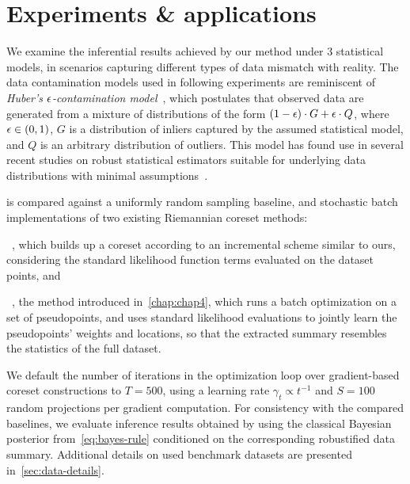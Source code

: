 \section{Experiments \& applications}
\label{sec:evaluation}
\newcommand{\MYhref}[3][oxfordblue]{\href{#2}{\color{#1}{#3}}}%

We examine the inferential results achieved by our method under 3 statistical models, in scenarios capturing different types of data mismatch with reality. The data contamination models used in following experiments are reminiscent of \emph{Huber's $\epsilon$-contamination model}~\citep{huber92}, which postulates that observed data are generated from a mixture of distributions of the form $(1-\epsilon)\cdot G+ \epsilon\cdot Q$, where $\epsilon \in (0,1)$,  $G$ is a distribution of inliers captured by the assumed statistical model, and $Q$ is an arbitrary distribution of outliers. This model has found use in several recent studies on robust statistical estimators suitable for underlying data distributions with minimal assumptions~\citep{wei17, chen18}.

\bcores{} is compared against a uniformly random sampling baseline, and stochastic batch implementations of two existing Riemannian coreset methods: 
\benum[label={(\roman*)}]
	\item \sparsevi~\citep{campbell19neurips}, which builds up a coreset according to an incremental scheme similar to ours, considering the standard likelihood function terms evaluated on the dataset points, and 
	\item \psvi~\citep{psvi}, the method introduced in~\cref{chap:chap4}, which runs a batch optimization on a set of pseudopoints, and uses standard likelihood evaluations to jointly learn the pseudopoints' weights and locations, so that the extracted summary resembles the statistics of the full dataset. 
\eenum


We default the number of iterations in the optimization loop over gradient-based coreset constructions to $ T = 500$, using a learning rate $ \gamma_t \propto t^{-1}$ and $S=100$ random projections per gradient computation. For consistency with the compared baselines, we evaluate inference results obtained by \bcores{} using the classical Bayesian posterior from~\cref{eq:bayes-rule} conditioned on the corresponding robustified data summary. Additional details on used benchmark datasets are presented in~\cref{sec:data-details}. %

